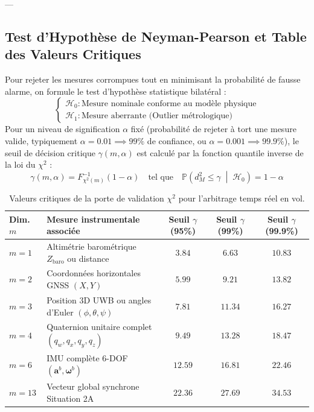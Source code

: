 \documentclass[../Formulations_Kalman.tex]{subfiles}
\begin{document}
---

\subsection{Test d'Hypothèse de Neyman-Pearson et Table des Valeurs Critiques}

Pour rejeter les mesures corrompues tout en minimisant la probabilité de fausse alarme, on formule le test d'hypothèse statistique bilatéral :
\begin{equation}
\begin{cases}
\mathcal{H}_0 : \text{Mesure nominale conforme au modèle physique} \\
\mathcal{H}_1 : \text{Mesure aberrante (Outlier métrologique)}
\end{cases}
\end{equation}
Pour un niveau de signification $\alpha$ fixé (probabilité de rejeter à tort une mesure valide, typiquement $\alpha = 0.01 \implies 99\%$ de confiance, ou $\alpha = 0.001 \implies 99.9\%$), le seuil de décision critique $\gamma(m, \alpha)$ est calculé par la fonction quantile inverse de la loi du $\chi^2$ :
\begin{equation}
\gamma(m, \alpha) = F_{\chi^2(m)}^{-1}(1 - \alpha) \quad \text{tel que} \quad \mathbb{P}\left( d_M^2 \le \gamma \;\middle|\; \mathcal{H}_0 \right) = 1 - \alpha
\end{equation}

\begin{table}[htbp]
\centering
\small
\setlength{\tabcolsep}{4pt}
\begin{tabular}{p{1.0cm} p{6.2cm} ccc}
\toprule
\textbf{Dim. $m$} & \textbf{Mesure instrumentale associée} & \textbf{Seuil $\gamma$ (95\%)} & \textbf{Seuil $\gamma$ (99\%)} & \textbf{Seuil $\gamma$ (99.9\%)} \\
\midrule
$m = 1$ & Altimétrie barométrique $Z_{\text{baro}}$ ou distance & $3.84$ & $6.63$ & $10.83$ \\
$m = 2$ & Coordonnées horizontales GNSS $(X, Y)$ & $5.99$ & $9.21$ & $13.82$ \\
$m = 3$ & Position 3D UWB ou angles d'Euler $(\phi, \theta, \psi)$ & $7.81$ & $11.34$ & $16.27$ \\
$m = 4$ & Quaternion unitaire complet $(q_w, q_x, q_y, q_z)$ & $9.49$ & $13.28$ & $18.47$ \\
$m = 6$ & IMU complète 6-DOF $(\mathbf{a}^b, \boldsymbol{\omega}^b)$ & $12.59$ & $16.81$ & $22.46$ \\
$m = 13$ & Vecteur global synchrone Situation 2A & $22.36$ & $27.69$ & $34.53$ \\
\bottomrule
\end{tabular}
\caption{Valeurs critiques de la porte de validation $\chi^2$ pour l'arbitrage temps réel en vol.}
\label{tab:annexe_chi2_seuils}
\end{table}
\end{document}
